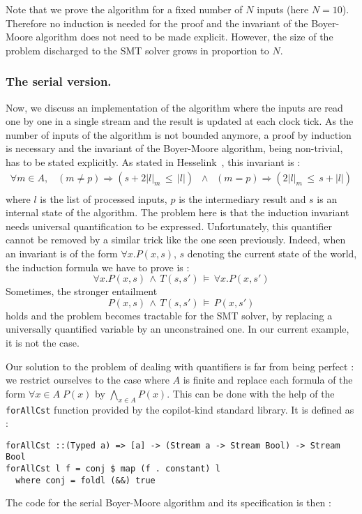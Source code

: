 Note that we prove the algorithm for a fixed number of $N$ inputs
(here $N=10$). Therefore no induction is needed for the proof and the
invariant of the Boyer-Moore algorithm does not need to be made explicit. However, the size of the problem discharged to the SMT solver grows in proportion to $N$.


\subsubsection{The serial version.} Now, we discuss an implementation
of the algorithm where the inputs are read one by one in a single
stream and the result is updated at each clock tick. As the number of
inputs of the algorithm is not bounded anymore, a proof by induction
is necessary and the invariant of the Boyer-Moore algorithm, being
non-trivial, has to be stated explicitly. As stated in
Hesselink~\cite{Hesselink2005}, this invariant is :
\[ \begin{array}{c}
\forall m \in A, \;\;\; \left(m \neq p\right) \Longrightarrow \left( s + 2|l|_m \,\leq\, |l| \right) \;\; \wedge \;\; \left(m = p\right) \Longrightarrow \left( 2|l|_m \,\leq\, s + |l| \right)
\\

\end{array} \]
where $l$ is the list of processed inputs, $p$ is the intermediary result and $s$ is an internal state of the algorithm. The problem here is that the induction invariant needs universal quantification to be expressed. Unfortunately, this quantifier cannot be removed by a similar trick like the one seen previously. Indeed, when an invariant is of the form $\forall x. P(x, s)$, $s$ denoting the current state of the world, the induction formula we have to prove is :
\[ \forall x. P(x, s) \,\wedge\, T\left(s, s' \right) \,\models\, \forall x. P(x, s') \]
Sometimes, the stronger entailment 
\[ P(x, s) \,\wedge\, T\left(s, s' \right) \,\models\, P(x, s') \]
holds and the problem becomes tractable for the SMT solver, by replacing a universally quantified variable by an unconstrained one. In our current example, it is not the case. 


Our solution to  the problem of dealing with quantifiers  is far from being perfect : we restrict ourselves
to the case where $A$ is finite and replace each formula of the form
$\forall x \in A \; P(x)$ by $\bigwedge_{x \in A} P(x)$. This can be
done with the help of the \texttt{forAllCst} function provided by the
copilot-kind standard library. It is defined as :
\begin{lstlisting}[frame=single]
forAllCst ::(Typed a) => [a] -> (Stream a -> Stream Bool) -> Stream Bool
forAllCst l f = conj $ map (f . constant) l
  where conj = foldl (&&) true
\end{lstlisting}
The code for the serial Boyer-Moore algorithm and its specification is then :

